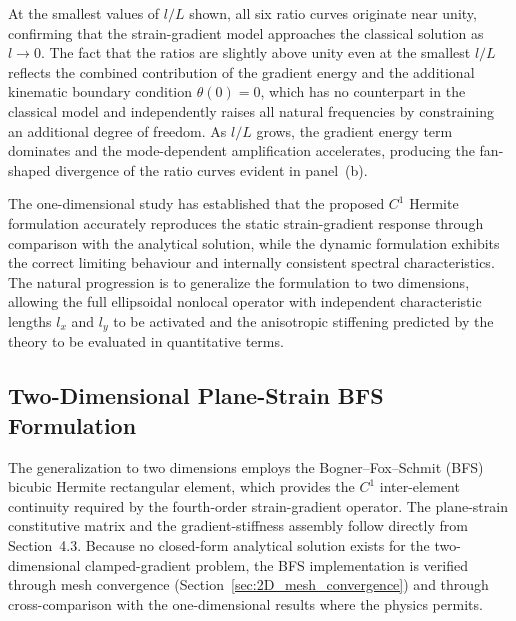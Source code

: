 \documentclass[final,3p,times,fleqn]{elsarticle}
\begin{document}
At the smallest values of $l/L$ shown, all six ratio curves originate
near unity, confirming that the strain-gradient model approaches the
classical solution as $l \to 0$.
The fact that the ratios are slightly above unity even at the smallest
$l/L$ reflects the combined contribution of the gradient energy and
the additional kinematic boundary condition $\theta(0) = 0$, which has
no counterpart in the classical model and independently raises all
natural frequencies by constraining an additional degree of freedom.
As $l/L$ grows, the gradient energy term dominates and the
mode-dependent amplification accelerates, producing the fan-shaped
divergence of the ratio curves evident in panel~(b).

The one-dimensional study has established that the proposed $C^{1}$ Hermite
formulation accurately reproduces the static strain-gradient response through
comparison with the analytical solution, while the dynamic formulation exhibits
the correct limiting behaviour and internally consistent spectral characteristics.
The natural progression is to generalize the formulation to two dimensions,
allowing the full ellipsoidal nonlocal operator with independent
characteristic lengths $l_{x}$ and $l_{y}$ to be activated and the
anisotropic stiffening predicted by the theory to be evaluated in
quantitative terms.

\subsection{Two-Dimensional Plane-Strain BFS Formulation}
\label{sec:2D_BFS}

The generalization to two dimensions employs the Bogner--Fox--Schmit (BFS)
bicubic Hermite rectangular element, which provides the $C^{1}$
inter-element continuity required by the fourth-order strain-gradient
operator.
The plane-strain constitutive matrix and the gradient-stiffness
assembly follow directly from Section~4.3.
Because no closed-form analytical solution exists for the
two-dimensional clamped-gradient problem, the BFS implementation is
verified through mesh convergence (Section~\ref{sec:2D_mesh_convergence})
and through cross-comparison with the one-dimensional results where
the physics permits.


\end{document}
